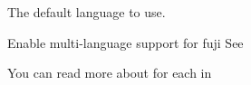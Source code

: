 \begin{Configuration}
{        \begin{NestedList}
            \item[language]{
                \item[]

                \begin{NestedList}
                    \item[default\_language]{
                        The default language to use.

                        \begin{tips}{Enable multi-language support for fuji}
                            See~
                        \end{tips}
                    }

                \end{NestedList}

            }
        \end{NestedList}
    }

\end{Configuration}

\clearpage
{}
You can read more about  for each  in 